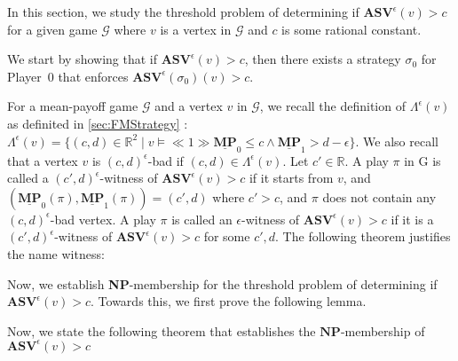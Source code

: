 In this section, we study the threshold problem of determining if $\mathbf{ASV}^{\epsilon}(v) > c$  for a given game $\mathcal{G}$ where $v$ is a vertex in $\mathcal{G}$ and $c$ is some rational constant.

We start by showing that if $\mathbf{ASV}^{\epsilon}(v) > c$, then there exists a strategy $\sigma_0$ for Player~0 that enforces $\mathbf{ASV}^{\epsilon}(\sigma_0)(v) > c$.



For a mean-payoff game $\mathcal{G}$ and a vertex $v$ in $\mathcal{G}$, we recall the definition of $\Lambda^{\epsilon}(v)$ as definited in \cref{sec:FMStrategy} : $\Lambda^{\epsilon}(v) = \{(c,d) \in \mathbb{R}^2 \mid v \models \ll 1 \gg \underline{\mathbf{MP}}_0 \leqslant c \land \underline{\mathbf{MP}}_1 > d-\epsilon \}$. We also recall that a vertex $v$ is $(c,d)^{\epsilon}$-bad if $(c,d) \in \Lambda^{\epsilon}(v)$. Let $c' \in \mathbb{R}$. A play $\pi$ in G is called a $(c',d)^{\epsilon}$-witness of $\mathbf{ASV}^{\epsilon}(v) > c$ if it starts from $v$, and $(\underline{\mathbf{MP}}_0(\pi), \underline{\mathbf{MP}}_1(\pi)) = (c', d)$ where $c' > c$, and $\pi$ does not contain any $(c,d)^{\epsilon}$-bad vertex. A play $\pi$ is called an $\epsilon$-witness of $\mathbf{ASV}^{\epsilon}(v) > c$ if it is a $(c',d)^{\epsilon}$-witness of $\mathbf{ASV}^{\epsilon}(v) > c$ for some $c',d$. The following theorem justifies the name witness:



Now, we establish \textbf{NP}-membership for the threshold problem of determining if $\mathbf{ASV}^{\epsilon}(v) > c$. Towards this, we first prove the following lemma.



Now, we state the following theorem that establishes the $\mathbf{NP}$-membership of $\mathbf{ASV}^{\epsilon}(v) > c$

